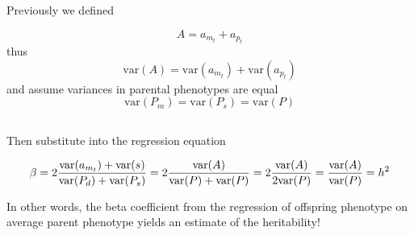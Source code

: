 \documentclass[
  letterpaper,
  DIV=11,
  numbers=noendperiod]{scrartcl}
\begin{document}
Previously we defined

\[
A = a_{m_t} + a_{p_t}
\] thus \[
\mathrm{var}(A) = \mathrm{var}(a_{m_{t}}) + \mathrm{var}(a_{p_t})
\] and assume variances in parental phenotypes are equal \[
\mathrm{var}(P_m) = \mathrm{var}(P_s) = \mathrm{var}(P)
\]

\subsection{}\label{section-19}

Then substitute into the regression equation

\[
\beta = 2\frac{\mathrm{var}(a_{m_{t}}) + \mathrm{var}(s)}{\mathrm{var}(P_d) + \mathrm{var}(P_s)} \\
= 2 \frac{\mathrm{var}(A)}{\mathrm{var}(P) + \mathrm{var}(P)} \\
= 2 \frac{\mathrm{var}(A)}{2 \mathrm{var}(P)} \\
= \frac{\mathrm{var}(A)}{\mathrm{var}(P)} \\
= h^2
\]

In other words, the beta coefficient from the regression of offspring
phenotype on average parent phenotype yields an estimate of the
heritability!
\end{document}
